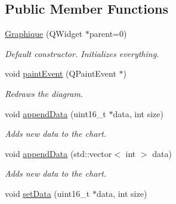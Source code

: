 \subsection*{Public Member Functions}
\begin{DoxyCompactItemize}
\item 
\hypertarget{classGraphique_a943dd2457569c423cc8eca1ec8fc27bb}{
\hyperlink{classGraphique_a943dd2457569c423cc8eca1ec8fc27bb}{Graphique} (QWidget $\ast$parent=0)}
\label{classGraphique_a943dd2457569c423cc8eca1ec8fc27bb}

\begin{DoxyCompactList}\small\item\em Default constructor. Initializes everything. \item\end{DoxyCompactList}\item 
\hypertarget{classGraphique_afa0291f982bb0a874a875fefe63dacd8}{
void \hyperlink{classGraphique_afa0291f982bb0a874a875fefe63dacd8}{paintEvent} (QPaintEvent $\ast$)}
\label{classGraphique_afa0291f982bb0a874a875fefe63dacd8}

\begin{DoxyCompactList}\small\item\em Redraws the diagram. \item\end{DoxyCompactList}\item 
\hypertarget{classGraphique_a37edcf5cec94013b53eee9704a592938}{
void \hyperlink{classGraphique_a37edcf5cec94013b53eee9704a592938}{appendData} (uint16\_\-t $\ast$data, int size)}
\label{classGraphique_a37edcf5cec94013b53eee9704a592938}

\begin{DoxyCompactList}\small\item\em Adds new data to the chart. \item\end{DoxyCompactList}\item 
\hypertarget{classGraphique_a0a7d0fed05f8d5e10d37277d09a8b799}{
void \hyperlink{classGraphique_a0a7d0fed05f8d5e10d37277d09a8b799}{appendData} (std::vector$<$ int $>$ data)}
\label{classGraphique_a0a7d0fed05f8d5e10d37277d09a8b799}

\begin{DoxyCompactList}\small\item\em Adds new data to the chart. \item\end{DoxyCompactList}\item 
\hypertarget{classGraphique_a7c9f3a4c73adba653dde26a575177e3c}{
void \hyperlink{classGraphique_a7c9f3a4c73adba653dde26a575177e3c}{setData} (uint16\_\-t $\ast$data, int size)}
\label{classGraphique_a7c9f3a4c73adba653dde26a575177e3c}


\end{DoxyCompactItemize}
